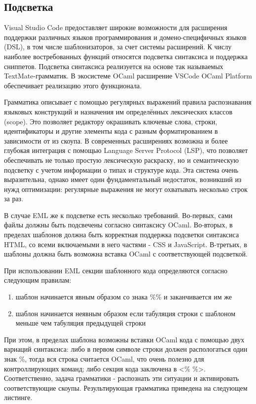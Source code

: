 \subsection{Подсветка}

Visual Studio Code предоставляет широкие возможности для расширения поддержки различных языков программирования и домено-специфичных языков (DSL), в том числе шаблонизаторов, за счет системы расширений.
К числу наиболее востребованных функций относятся подсветка синтаксиса и поддержка сниппетов.
Подсветка синтаксиса реализуется на основе так называемых TextMate-грамматик.
В экосистеме OCaml расширение VSCode OCaml Platform обеспечивает реализацию этого функционала.

Грамматика описывает с помощью регулярных выражений правила распознавания языковых конструкций и назначения им определённых лексических классов (scope).
Это позволяет редактору окрашивать ключевые слова, строки, идентификаторы и другие элементы кода с разным форматированием в зависимости от из скоупа.
В современных расширениях возможна и более глубокая интеграция с помощью Language Server Protocol (LSP), что позволяет обеспечивать не только простую лексическую раскраску, но и семантическую подсветку с учетом информации о типах и структуре кода.
Эта система очень выразительна, однако имеет один фундаментальный недостаток, возникший из нужд оптимизации: регулярные выражения не могут охватывать несколько строк за раз.

В случае EML же к подсветке есть несколько требований.
Во-первых, сами файлы должны быть подсвечены согласно синтаксису OCaml.
Во-вторых, в пределах шаблонов должна быть корректная поддержка подсветки синтаксиса HTML, со всеми включаемыми в него частями - CSS и JavaScript.
В-третьих, в шаблоны должна быть возможна вставка OCaml с соответствующей подсветкой.

При использовании EML секции шаблонного кода определяются согласно следующим правилам:
\begin{enumerate}
    \item шаблон начинается явным образом со знака \%\% и заканчивается им же
    \item шаблон начинается неявным образом если табуляция строки с шаблоном меньше чем табуляция предыдущей строки
\end{enumerate}

При этом, в пределах шаблона возможны вставки OCaml кода с помощью двух вариаций синтаксиса:
либо в первом символе строки должен распологаться один знак \%, тогда вся строка считается OCaml, что очень полезно для контроллирующих команд;
либо секция кода заключена в <\% \%>.
Соответственно, задача грамматики - распознать эти ситуации и активировать соответствующие скоупы.
Результирующая грамматика приведена на следующем листинге.

